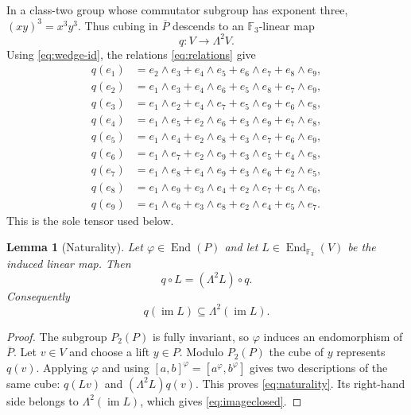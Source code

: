 \documentclass[10pt,a4paper]{amsart}
\newtheorem{lemma}[theorem]{Lemma}
\newcommand{\F}{\mathbb F}
\newcommand{\End}{\operatorname{End}}
\newcommand{\im}{\operatorname{im}}
\begin{document}
In a class-two group whose commutator subgroup has exponent three,
$(xy)^3=x^3y^3$.  Thus cubing in $\overline P$ descends to an
$\F_3$-linear map
\begin{equation}\label{eq:q}
                         q:V\longrightarrow\Lambda^2V.
\end{equation}
Using \eqref{eq:wedge-id}, the relations \eqref{eq:relations} give
\begin{align*}
q(e_1)&=e_2\wedge e_3+e_4\wedge e_5+e_6\wedge e_7+e_8\wedge e_9,\\
q(e_2)&=e_1\wedge e_3+e_4\wedge e_6+e_5\wedge e_8+e_7\wedge e_9,\\
q(e_3)&=e_1\wedge e_2+e_4\wedge e_7+e_5\wedge e_9+e_6\wedge e_8,\\
q(e_4)&=e_1\wedge e_5+e_2\wedge e_6+e_3\wedge e_9+e_7\wedge e_8,\\
q(e_5)&=e_1\wedge e_4+e_2\wedge e_8+e_3\wedge e_7+e_6\wedge e_9,\\
q(e_6)&=e_1\wedge e_7+e_2\wedge e_9+e_3\wedge e_5+e_4\wedge e_8,\\
q(e_7)&=e_1\wedge e_8+e_4\wedge e_9+e_3\wedge e_6+e_2\wedge e_5,\\
q(e_8)&=e_1\wedge e_9+e_3\wedge e_4+e_2\wedge e_7+e_5\wedge e_6,\\
q(e_9)&=e_1\wedge e_6+e_3\wedge e_8+e_2\wedge e_4+e_5\wedge e_7.
\end{align*}
This is the sole tensor used below.

\begin{lemma}[Naturality]\label{lem:naturality}
Let $\varphi\in\End(P)$ and let $L\in\End_{\F_3}(V)$ be the induced
linear map.  Then
\begin{equation}\label{eq:naturality}
                   q\circ L=(\Lambda^2L)\circ q.
\end{equation}
Consequently
\begin{equation}\label{eq:imageclosed}
                   q(\im L)\subseteq\Lambda^2(\im L).
\end{equation}
\end{lemma}

\begin{proof}
The subgroup $P_2(P)$ is fully invariant, so $\varphi$ induces an
endomorphism of $\overline P$.  Let $v\in V$ and choose a lift $y\in P$.
Modulo $P_2(P)$ the cube of $y$ represents $q(v)$.  Applying $\varphi$
and using $[a,b]^\varphi=[a^\varphi,b^\varphi]$ gives two descriptions
of the same cube: $q(Lv)$ and $(\Lambda^2L)q(v)$.  This proves
\eqref{eq:naturality}.  Its right-hand side belongs to
$\Lambda^2(\im L)$, which gives \eqref{eq:imageclosed}.
\end{proof}
\end{document}
